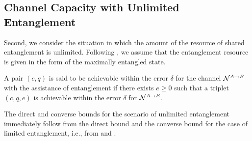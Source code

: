 \documentclass[journal]{IEEEtran}
\begin{document}
\subsection{Channel Capacity with Unlimited Entanglement}

Second, we consider the situation in which the amount of the resource of shared entanglement is unlimited.
Following \cite{datta2012one}, we assume that the entanglement resource is given in the form of the maximally entangled state.


A pair $(c,q)$ is said to be achievable within the error $\delta$ for the channel ${\mathcal N}^{A\rightarrow B}$ with the assistance of entanglement if there exists $e\geq0$ such that a triplet $(c,q,e)$ is achievable within the error $\delta$ for ${\mathcal N}^{A\rightarrow B}$.
\edfn

\noindent
The direct and converse bounds for the scenario of unlimited entanglement immediately follow from the direct bound and the converse bound for the case of limited entanglement, i.e., from  and .
\end{document}

